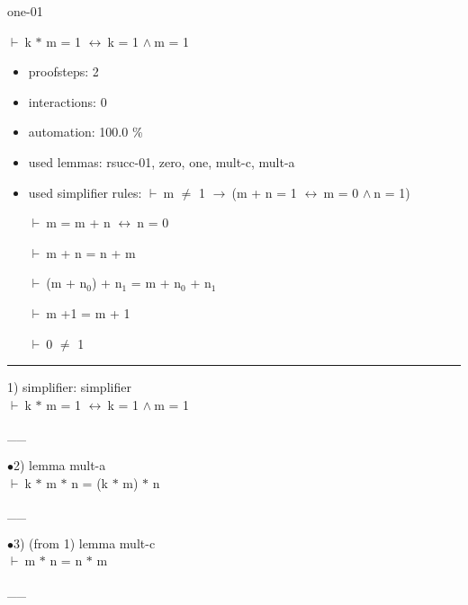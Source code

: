\documentclass[a4paper]{article}
\newcommand{\Fol}{\mbox{$\vdash\ $}}
\newcommand{\And}{\mbox{$\wedge\ $}}
\newcommand{\Imp}{\mbox{$\rightarrow\ $}}
\newcommand{\Equiv}{\mbox{$\leftrightarrow\ $}}
\begin{document}
\raggedright
              



\begin{minipage}{\textwidth}
\begin{center}

\end{center}
\end{minipage}

\vspace{5ex}

{\Huge one-01}

\vspace{5ex}

 \Fol k $*$ m = 1 \Equiv k = 1 \And m = 1

\begin{itemize}
\item proofsteps: 2
\item interactions: 0
\item automation: 100.0 \%
\item used lemmas: rsucc-01, zero, one, mult-c, mult-a 
\item used simplifier rules:
 \Fol m $\neq$ 1 \Imp (m + n = 1 \Equiv m = 0 \And n = 1)

 \Fol m = m + n \Equiv n = 0

 \Fol m + n = n + m

 \Fol (m + $\mbox{n}_{0}$) + $\mbox{n}_{1}$ = m + $\mbox{n}_{0}$ + $\mbox{n}_{1}$

 \Fol m +1 = m + 1

 \Fol 0 $\neq$ 1



               \end{itemize}



\vspace{3ex}\rule{1\textwidth}{1mm}


1) simplifier: simplifier \\
 \Fol k $*$ m = 1 \Equiv k = 1 \And m = 1

\vspace{-1.5ex}\_\hrulefill \_

$\bullet$2) lemma mult-a \\
 \Fol k $*$ m $*$ n = (k $*$ m) $*$ n

\vspace{-1.5ex}\_\hrulefill \_

$\bullet$3)  (from 1) lemma mult-c \\
 \Fol m $*$ n = n $*$ m

\vspace{-1.5ex}\_\hrulefill \_
\end{document}

